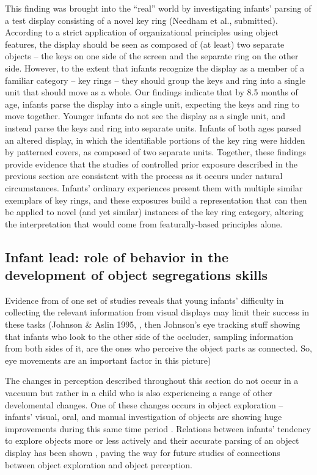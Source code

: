 This finding was brought into the ``real'' world by investigating
infants' parsing of a test display consisting of a novel key
ring (Needham et al., submitted).  According to a strict
application of organizational principles using object features, the
display should be seen as composed of (at least) two separate
objects -- the keys on one side of the screen and the separate
ring on the other side.  However, to the extent that infants recognize
the display as a member of a familiar category -- key
rings -- they should group the keys and ring into a single unit
that should move as a whole.  Our findings indicate that by 8.5 months
of age, infants parse the display into a single unit, expecting the
keys and ring to move together.  Younger infants do not see the
display as a single unit, and instead parse the keys and ring into
separate units.  Infants of both ages parsed an altered display, in
which the identifiable portions of the key ring were hidden by
patterned covers, as composed of two separate units.  Together, these
findings provide evidence that the studies of controlled prior
exposure described in the previous section are consistent with the
process as it occurs under natural circumstances.  Infants'
ordinary experiences present them with multiple similar exemplars of
key rings, and these exposures build a representation that can then be
applied to novel (and yet similar) instances of the key ring category,
altering the interpretation that would come from featurally-based
principles alone.




\subsection{Infant lead: role of behavior in the development of object segregations skills}

Evidence from of one set of studies reveals that young
infants' difficulty in collecting the relevant information
from visual displays may limit their success in these tasks (Johnson \&
Aslin 1995, \cite{johnson96perception}, then Johnson's eye tracking stuff
\cite{johnson04where} showing
that infants who look to the other side of the occluder, sampling
information from both sides of it, are the ones who perceive the
object parts as connected.  So, eye movements are an important factor
in this picture)

The changes in perception described throughout this section
do not occur in a vaccuum but rather in a
child who is also experiencing a range of other develomental changes.
One of these changes occurs in object
exploration -- infants' visual, oral, and manual
investigation of objects are showing huge improvements during this
same time period \cite{rochat89object}.  Relations between infants'
tendency to explore objects more or less actively and their accurate
parsing of an object display has been shown \cite{needham00improvements}, paving
the way for future studies of connections between object exploration
and object perception.





